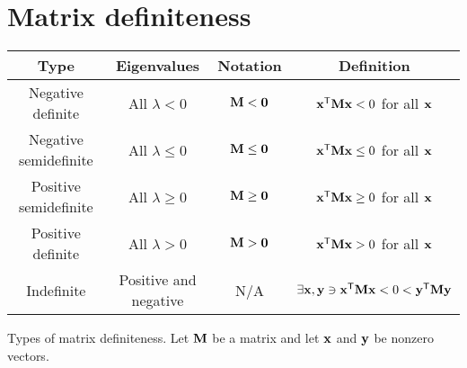 \section{Matrix definiteness}
\begin{booktable}
  \begin{tabular}{|cccc|}
    \hline
    \rowcolor{headingbg}
    \textbf{Type} & \textbf{Eigenvalues} & \textbf{Notation} &
      \textbf{Definition} \\
    \hline
    Negative definite &
      All $\lambda < 0$ &
      $\mathbf{M} < \mathbf{0}$ &
      $\mathbf{x}^\mathsf{T}\mathbf{M}\mathbf{x} < 0$ for all $\mathbf{x}$ \\
    Negative semidefinite &
      All $\lambda \leq 0$ &
      $\mathbf{M} \leq \mathbf{0}$ &
      $\mathbf{x}^\mathsf{T}\mathbf{M}\mathbf{x} \leq 0$ for all $\mathbf{x}$ \\
    Positive semidefinite &
      All $\lambda \geq 0$ &
      $\mathbf{M} \geq \mathbf{0}$ &
      $\mathbf{x}^\mathsf{T}\mathbf{M}\mathbf{x} \geq 0$ for all $\mathbf{x}$ \\
    Positive definite &
      All $\lambda > 0$ &
      $\mathbf{M} > \mathbf{0}$ &
      $\mathbf{x}^\mathsf{T}\mathbf{M}\mathbf{x} > 0$ for all $\mathbf{x}$ \\
    Indefinite &
      Positive and negative &
      N/A &
      $\exists \mathbf{x}, \mathbf{y} \ni \mathbf{x}^\mathsf{T}\mathbf{M}\mathbf{x} < 0 < \mathbf{y}^\mathsf{T}\mathbf{M}\mathbf{y}$ \\
    \hline
  \end{tabular}
  \caption{Types of matrix definiteness. Let $\mathbf{M}$ be a matrix and let
    $\mathbf{x}$ and $\mathbf{y}$ be nonzero vectors.}
\end{booktable}
